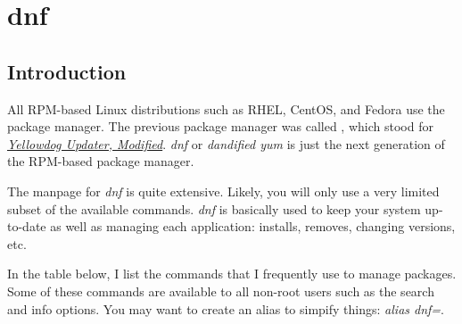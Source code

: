 \chapter{dnf}
\pagestyle{fancy}
\label{ch:dnf}

\fancyhf{} %
\fancyhead[OC]{\leftmark} %
\setlength{\headheight}{13.99pt} 
\cfoot{\thepage} %
		

\section{Introduction}
All RPM-based Linux distributions such as RHEL, CentOS, and Fedora use the  package manager. The previous package manager was called , which stood for \href{https://en.wikipedia.org/wiki/Yellowdog\_Updater,\_Modified}{\emph{Yellowdog Updater, Modified}}. \emph{dnf} or \emph{dandified yum} is just the next generation of the RPM-based package manager.

The manpage for \emph{dnf} is quite extensive. Likely, you will only use a very limited subset of the available commands. \emph{dnf} is basically used to keep your system up-to-date as well as managing each application: installs, removes, changing versions, etc.

In the table below, I list the commands that I frequently use to manage packages. Some of these commands are available to all non-root users such as the search and info options. You may want to create an alias to simpify things: \emph{alias dnf=}.

